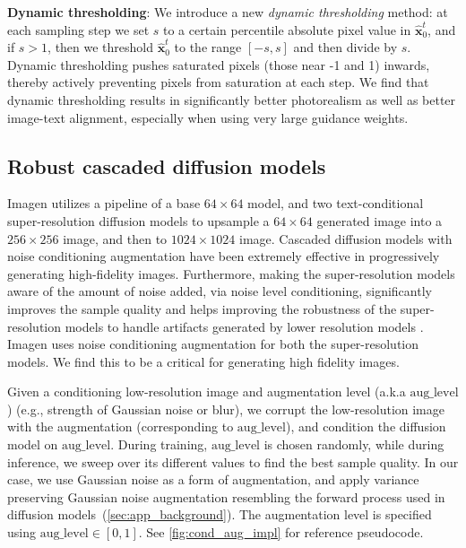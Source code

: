 \textbf{Dynamic thresholding}: We introduce a new \emph{dynamic thresholding} method: at each sampling step we set $s$ to a certain percentile absolute pixel value in $\hat{\mathbf{x}}^t_0$, and if $s>1$, then we threshold $\hat{\mathbf{x}}^t_0$ to the range $[-s, s]$ and then divide by $s$. Dynamic thresholding pushes saturated pixels (those near -1 and 1) inwards, thereby actively preventing pixels from saturation at each step. We find that dynamic thresholding results in significantly better photorealism as well as better image-text alignment, especially when using very large guidance weights. 

\subsection{Robust cascaded diffusion models}

Imagen utilizes a pipeline of a base $64\times64$ model, and two text-conditional super-resolution diffusion models to upsample a $64\times64$ generated image into a $256\times256$ image, and then to $1024\times1024$ image. Cascaded diffusion models with noise conditioning augmentation \citep{ho2021cascaded} have been extremely effective in progressively generating high-fidelity images. Furthermore, making the super-resolution models aware of the amount of noise added, via noise level conditioning, significantly improves the sample quality and helps improving the robustness of the super-resolution models to handle artifacts generated by lower resolution models \cite{ho2021cascaded}. Imagen uses noise conditioning augmentation for both the super-resolution models. We find this to be a critical for generating high fidelity images.

Given a conditioning low-resolution image and augmentation level (a.k.a $\mathrm{aug\_level}$) (e.g., strength of Gaussian noise or blur), we corrupt the low-resolution image with the augmentation (corresponding to $\mathrm{aug\_level}$), and condition the diffusion model on $\mathrm{aug\_level}$. During training, $\mathrm{aug\_level}$ is chosen randomly, while during inference, we sweep over its different values to find the best sample quality. In our case, we use Gaussian noise as a form of augmentation, and apply variance preserving Gaussian noise augmentation resembling the forward process used in diffusion models~(\ref{sec:app_background}). The augmentation level is specified using $\mathrm{aug\_level} \in [0, 1]$. See \ref{fig:cond_aug_impl} for reference pseudocode.

